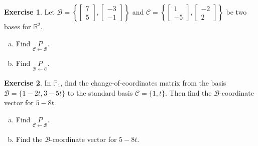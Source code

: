 \documentclass[10pt]{book}
\theoremstyle{definition}
\newtheorem{exercise}{Exercise}[section]
\newcommand{\R}{\mathbb{R}}
\newcommand{\Poly}{\mathbb{P}}
\newcommand{\B}{\mathscr{B}}
\newcommand{\C}{\mathscr{C}}
\newcommand{\CoC}[2]{\underset{#2\leftarrow #1}{P}}
\begin{document}
\begin{exercise} %
	Let $\B=\left\{ \begin{bmatrix}7\\5\end{bmatrix},\begin{bmatrix}-3\\-1\end{bmatrix} \right\}$ and $\C=\left\{ \begin{bmatrix}1\\-5\end{bmatrix},\begin{bmatrix}-2\\2\end{bmatrix} \right\}$ be two bases for $\R^2$.
	\begin{multicols}{2}
		\begin{enumerate}[(a)]
			\item Find $\CoC{\B}{\C}$.
			\item Find $\CoC{\C}{\B}$.
		\end{enumerate}
	\end{multicols}
\end{exercise}
\vfill


\begin{exercise} %
	In $\Poly_1$, find the change-of-coordinates matrix from the basis $\B=\{ 1-2t , 3-5t \}$ to the standard basis $\C=\{1,t\}$. Then find the $\B$-coordinate vector for $5-8t$.
	\begin{multicols}{2}
		\begin{enumerate}[(a)]
			\item Find $\CoC{\B}{\C}$.
			\item Find the $\B$-coordinate vector for $5-8t$.
		\end{enumerate}
	\end{multicols}
\end{exercise}
\vfill




\newpage


\setcounter{section}{0}
\end{document}
